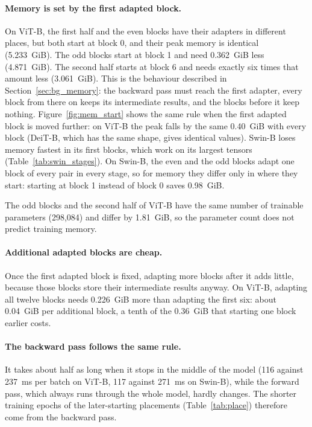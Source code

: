 \paragraph{Memory is set by the first adapted block.} On ViT-B, the first half and the even blocks have their
adapters in different places, but both start at block 0, and their peak memory is identical (5.233~GiB). The odd
blocks start at block 1 and need 0.362~GiB less (4.871~GiB). The second half starts at block 6 and needs exactly six
times that amount less (3.061~GiB). This is the behaviour described in Section~\ref{sec:bg_memory}: the backward pass
must reach the first adapter, every block from there on keeps its intermediate results, and the blocks before it
keep nothing. Figure~\ref{fig:mem_start} shows the same rule when the first adapted block is moved further: on
ViT-B the peak falls by the same 0.40~GiB with every block (DeiT-B, which has the same shape, gives identical
values). Swin-B loses memory fastest in its first blocks, which work on its largest
tensors (Table~\ref{tab:swin_stages}). On Swin-B, the even and the odd blocks
adapt one block of every pair in every stage, so for memory they differ only in where they start: starting at block 1 instead of
block 0 saves 0.98~GiB.

The odd blocks and the second half of ViT-B have the same number of trainable parameters (298,084) and differ by
1.81~GiB, so the parameter count does not predict training memory.

\paragraph{Additional adapted blocks are cheap.} Once the first adapted block is fixed, adapting more blocks after
it adds little, because those blocks store their intermediate results anyway. On ViT-B, adapting all twelve blocks
needs 0.226~GiB more than adapting the first six: about 0.04~GiB per additional block, a tenth of the 0.36~GiB that
starting one block earlier costs.

\paragraph{The backward pass follows the same rule.} It takes about half as long when it stops in the middle of the
model (116 against 237~ms per batch on ViT-B, 117 against 271~ms on Swin-B), while the forward pass, which always
runs through the whole model, hardly changes. The shorter training epochs of the later-starting placements
(Table~\ref{tab:place}) therefore come from the backward pass.

